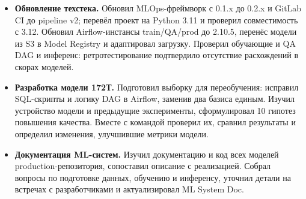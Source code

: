 \documentclass[a4paper,11pt]{article}
\begin{document}
\begin{itemize}
\item \textbf{Обновление техстека.} Обновил MLOps-фреймворк с 0.1.x до 0.2.x и GitLab CI до pipeline v2; перевёл проект на Python 3.11 и проверил совместимость с 3.12. Обновил Airflow-инстансы train/QA/prod до 2.10.5, перенёс модели из S3 в Model Registry и адаптировал загрузку. Проверил обучающие и QA DAG и инференс: ретротестирование подтвердило отсутствие расхождений в скорах моделей.
\item \textbf{Разработка модели 172Т.} Подготовил выборку для переобучения: исправил SQL-скрипты и логику DAG в Airflow, заменив два базиса единым. Изучил устройство модели и предыдущие эксперименты, сформулировал 10 гипотез повышения качества. Вместе с командой проверил их, сравнил результаты и определил изменения, улучшившие метрики модели.
\item \textbf{Документация ML-систем.} Изучил документацию и код всех моделей production-репозитория, сопоставил описание с реализацией. Собрал вопросы по подготовке данных, обучению и инференсу, уточнил детали на встречах с разработчиками и актуализировал ML System Doc.
\end{itemize}
\newpage
\end{document}

